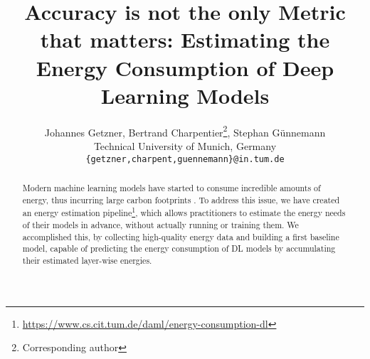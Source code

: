 \documentclass{article} %
\title{Accuracy is not the only Metric that matters: Estimating the
Energy Consumption of Deep Learning Models}
\author{%
  Johannes Getzner, Bertrand Charpentier\thanks{Corresponding author}, Stephan Günnemann \\
  Technical University of Munich, Germany\\
  \texttt{\{getzner,charpent,guennemann\}@in.tum.de} \\
}
\begin{document}
\maketitle

\begin{abstract}
Modern machine learning models have started to consume incredible amounts of energy, thus incurring large carbon footprints \citep{DBLP:journals/corr/abs-1906-02243}. To address this issue, we have created an energy estimation pipeline\footnote{\url{https://www.cs.cit.tum.de/daml/energy-consumption-dl}}, which allows practitioners to estimate the energy needs of their models in advance, without actually running or training them. We accomplished this, by collecting high-quality energy data and building a first baseline model, capable of predicting the energy consumption of DL models by accumulating their estimated layer-wise energies.
\end{abstract}






\newpage


\newpage
\appendix

\end{document}
